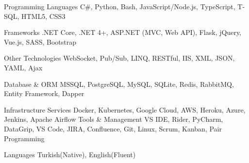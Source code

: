 

\begin{cvskills}

  \cvskill
    {Programming Languages} %
    {C\#, Python, Bash, JavaScript/Node.js, TypeScript, T-SQL, HTML5, CSS3 } %

  \cvskill
    {Frameworks} %
    {.NET Core, .NET 4+, ASP.NET (MVC, Web API), Flask, jQuery, Vue.js, SASS, Bootstrap} %

  \cvskill
    {Other Technologies} %
    {WebSocket, Pub/Sub, LINQ, RESTful, IIS, XML, JSON, YAML, Ajax} %

  \cvskill
    {Database \& ORM} %
    {MSSQL, PostgreSQL, MySQL, SQLite, Redis, RabbitMQ, Entity Framework, Dapper} %

%
  \cvskill
    {Infrastructure Services} %
    {Docker, Kubernetes, Google Cloud, AWS, Heroku, Azure, Jenkins, Apache Airflow}
  \cvskill
    {Tools \& Management} %
    {VS IDE, Rider, PyCharm, DataGrip, VS Code, JIRA, Confluence, Git, Linux, Scrum, Kanban, Pair Programming} %

  \cvskill
    {Languages} %
    {Turkish(Native), English(Fluent)} %

\end{cvskills}